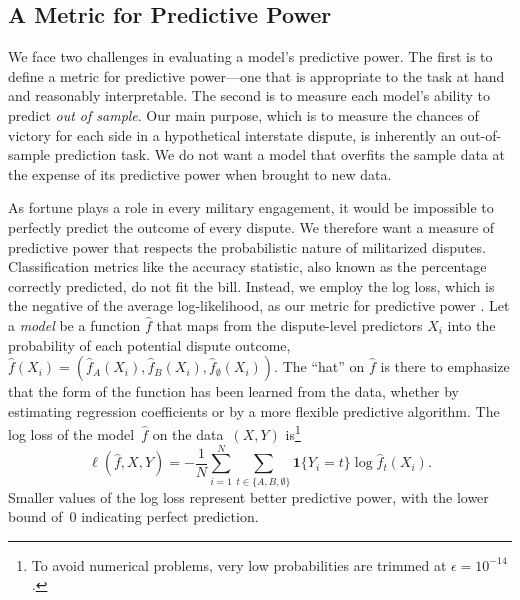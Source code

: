 \subsection{A Metric for Predictive Power}

We face two challenges in evaluating a model's predictive power.
The first is to define a metric for predictive power---one that is appropriate to the task at hand and reasonably interpretable.
The second is to measure each model's ability to predict \emph{out of sample}.
Our main purpose, which is to measure the chances of victory for each side in a hypothetical interstate dispute, is inherently an out-of-sample prediction task.
We do not want a model that overfits the sample data at the expense of its predictive power when brought to new data.

As fortune plays a role in every military engagement, it would be impossible to perfectly predict the outcome of every dispute.
We therefore want a measure of predictive power that respects the probabilistic nature of militarized disputes.
Classification metrics like the accuracy statistic, also known as the percentage correctly predicted, do not fit the bill.
Instead, we employ the log loss, which is the negative of the average log-likelihood, as our metric for predictive power \citep[221]{Hastie:2009wpa}.
Let a \emph{model} be a function $\hat{f}$ that maps from the dispute-level predictors $X_i$ into the probability of each potential dispute outcome, $\hat{f}(X_i) = (\hat{f}_A(X_i), \hat{f}_B(X_i), \hat{f}_{\emptyset}(X_i))$.
The ``hat'' on $\hat{f}$ is there to emphasize that the form of the function has been learned from the data, whether by estimating regression coefficients or by a more flexible predictive algorithm.
The log loss of the model~$\hat{f}$ on the data~$(X, Y)$ is\footnote{
  To avoid numerical problems, very low probabilities are trimmed at $\epsilon = 10^{-14}$.
}
\begin{equation}
  \label{eq:log-loss}
  \ell(\hat{f}, X, Y)
  =
  - \frac{1}{N} \sum_{i = 1}^{N} \sum_{t \in \{A, B, \emptyset\}}
  \mathbf{1} \{Y_i = t\} \log \hat{f}_t(X_i).
\end{equation}
Smaller values of the log loss represent better predictive power, with the lower bound of~$0$ indicating perfect prediction.

